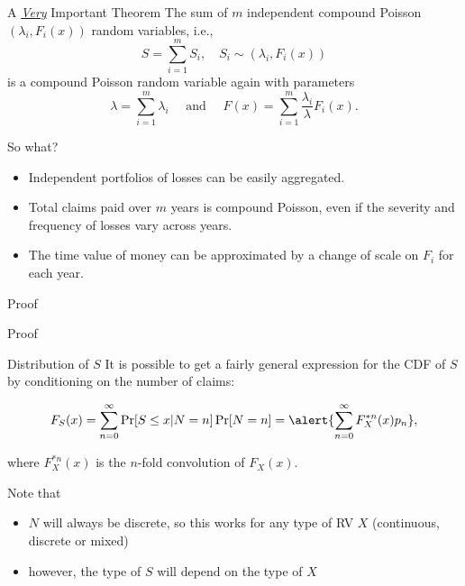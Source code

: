 \documentclass[11pt]{beamer}
\begin{document}
\begin{frame}{A \underline{\textit{Very}} Important Theorem }
The sum of $m$ independent compound Poisson $(\lambda_i,F_i(x))$ random variables, i.e.,
$$S = \sum^m_{i=1} S_i, \quad S_i \sim (\lambda_i,F_i(x))$$
is a compound Poisson random variable again with parameters
$$\lambda=\sum_{i=1}^m \lambda_i \quad \text{ and }\quad F(x)=\sum_{i=1}^m \frac{\lambda_i}{\lambda}F_i(x).$$


\end{frame}
\begin{frame}{So what?}

\begin{itemize}
\item Independent portfolios of losses can be easily aggregated.

\vfill

\item Total claims paid over $m$ years is compound Poisson, even if the severity and frequency of losses vary across years.

\vfill

\item The time value of money can be approximated by a change of scale on $F_i$ for each year.
\end{itemize}

\end{frame}
\begin{frame}{Proof}

\end{frame}
\begin{frame}{Proof}

\end{frame}
\begin{frame}{Distribution of $S$}
It is possible to get a fairly \alert{general expression for the CDF of $S$} by conditioning on the number of claims:

\vfill

$$F_S(x)=\sum_{n=0}^\infty \Pr[S\le x|N=n]\Pr[N=n]=\alert{\sum_{n=0}^\infty F^{*n}_X(x)p_n},$$

\vfill

where $F^{*n}_X(x)$ is the $n$-fold convolution of $F_X (x)$.

Note that
\begin{itemize}
\item $N$ will always be discrete, so this works for any type of RV $X$ (continuous, discrete or mixed)
\item however, the type of $S$ will depend on the type of $X$
\end{itemize}

\end{frame}
\end{document}
